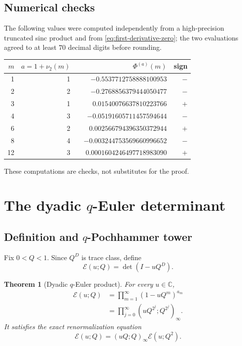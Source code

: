 \documentclass[11pt,oneside]{article}
\numberwithin{equation}{section}
\theoremstyle{plain}
\newtheorem{theorem}{Theorem}[section]
\theoremstyle{definition}
\theoremstyle{remark}
\newcommand{\C}{\mathbb C}
\newcommand{\Ecal}{\mathscr E}
\begin{document}
\subsection{Numerical checks}

The following values were computed independently from a high-precision truncated sinc product and from \cref{eq:first-derivative-zero}; the two evaluations agreed to at least $70$ decimal digits before rounding.
\begin{center}
\begin{tabular}{@{}rrrr@{}}
\toprule
$m$ & $a=1+\nu_2(m)$ & $\Phi^{(a)}(m)$ & sign\\
\midrule
1  & 1 & $-0.5537712758888100953$ & $-$\\
2  & 2 & $-0.2768856379444050477$ & $-$\\
3  & 1 & $\phantom{-}0.01540076637810223766$ & $+$\\
4  & 3 & $-0.05191605711457594644$ & $-$\\
6  & 2 & $\phantom{-}0.002566794396350372944$ & $+$\\
8  & 4 & $-0.003244753569660996652$ & $-$\\
12 & 3 & $\phantom{-}0.0001604246497718983090$ & $+$\\
\bottomrule
\end{tabular}
\end{center}
These computations are checks, not substitutes for the proof.

\section{The dyadic $q$-Euler determinant}

\subsection{Definition and $q$-Pochhammer tower}

Fix $0<Q<1$.  Since $Q^D$ is trace class, define
\begin{equation}\label{eq:E-def}
 \Ecal(u;Q)=\det(I-uQ^D).
\end{equation}

\begin{theorem}[Dyadic $q$-Euler product]\label{thm:E-product}
For every $u\in\C$,
\begin{align}
 \Ecal(u;Q)
 &=\prod_{m=1}^{\infty}(1-uQ^m)^{a_m}\label{eq:E-mult}\\
 &=\prod_{j=0}^{\infty}(uQ^{2^j};Q^{2^j})_\infty.\label{eq:E-tower}
\end{align}
It satisfies the exact renormalization equation
\begin{equation}\label{eq:E-scale}
 \boxed{\ \Ecal(u;Q)=(uQ;Q)_\infty\Ecal(u;Q^2).\ }
\end{equation}
\end{theorem}
\end{document}
